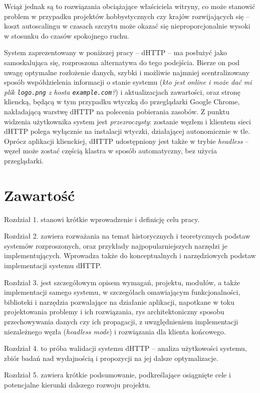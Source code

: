 Wciąż jednak są to rozwiązania obciążające właściciela witryny, co może stanowić problem w przypadku projektów hobbystycznych czy krajów rozwijających się -- koszt autoscalingu w czasach szczytu może okazać się nieproporcjonalnie wysoki w stosunku do czasów spokojnego ruchu.


System zaprezentowany w poniższej pracy -- dHTTP -- ma posłużyć jako samoskalująca się, rozproszona alternatywa do tego podejścia. Bierze on pod uwagę optymalne rozłożenie danych, szybki i możliwie najmniej scentralizowany sposób współdzielenia informacji o stanie systemu ({\em kto jest online i może dać mi plik \texttt{logo.png} z hosta \texttt{example.com}?}) i aktualizacjach zawartości, oraz stronę kliencką, będącą w tym przypadku wtyczką do przeglądarki Google Chrome, nakładającą warstwę dHTTP na polecenia pobierania zasobów. Z punktu widzenia użytkownika system jest {\em przezroczysty}: zostanie  węzłem i klientem sieci dHTTP polega wyłącznie na instalacji wtyczki, działającej autonomicznie w tle. Oprócz aplikacji klienckiej, dHTTP udostępniony jest także w trybie {\em headless} -- węzeł może zostać częścią klastra w sposób automatyczny, bez użycia przeglądarki.

\section{Zawartość}
\label{sec:zawartosc}

Rozdział 1. stanowi krótkie wprowadzenie i definicję celu pracy. 

Rozdział 2. zawiera rozważania na temat historycznych i teoretycznych podstaw systemów rozproszonych, oraz przykłady najpopularniejszych narzędzi je implementujących. Wprowadza także do konceptualnych i narzędziowych podstaw implementacji systemu dHTTP. 

Rozdział 3. jest szczegółowym opisem wymagań, projektu, modułów, a także implementacji samego systemu, w szczegółach omawiającym funkcjonalności, biblioteki i narzędzia pozwalające na działanie aplikacji, napotkane w toku projektowania problemy i ich rozwiązania, rys architektoniczny sposobu przechowywania danych czy ich propagacji, z uwzględnieniem implementacji niezależnego węzła ({\em headless mode}) i rozwiązania dla klienta końcowego.

Rozdział 4. to próba walidacji systemu dHTTP – analiza użytkowości systemu, zbiór badań nad wydajnością i propozycji na jej dalsze optymalizacje.

Rozdział 5. zawiera krótkie podsumowanie, podkreślające osiągnięte cele i potencjalne kierunki dalszego rozwoju projektu.

